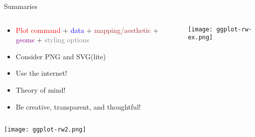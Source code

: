 \documentclass[10pt]{beamer}
\begin{document}
\begin{frame}{Summaries}
  \begin{columns}
    \begin{column}{0.5\textwidth}
    \begin{itemize}
      \item \textcolor{red}{Plot command} + \textcolor{blue}{data} + \textcolor{brown}{mapping/aesthetic} + \textcolor{purple}{geoms} + \textcolor{gray}{styling options}
      \item Consider PNG and SVG(lite)
      \item Use the internet!
        \item Theory of mind!
        \item Be creative, transparent, and thoughtful!
    \end{itemize}
    \end{column}
      \begin{column}{0.5\textwidth}
        \texttt{[image: ggplot-rw-ex.png]}
      \end{column}
  \end{columns}
  \centering
  \texttt{[image: ggplot-rw2.png]}
\end{frame}
\end{document}
